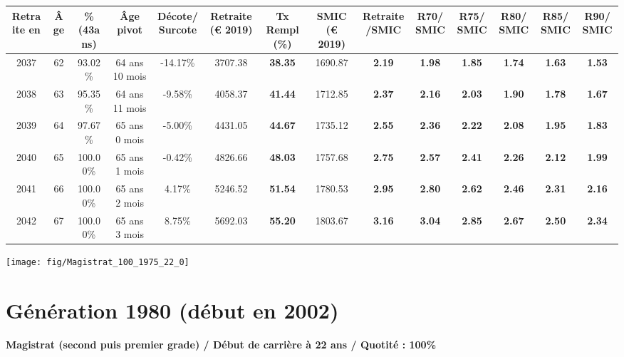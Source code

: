 \begin{adjustbox}{max width=\textwidth} 
\begin{tabular}[htb]{|c|c||c|c|c||c|c||c|c||c|c|c|c|c|} 
\hline 
 Retraite en &  Âge &  \%(43ans) &  Âge pivot &  Décote/Surcote &  Retraite (\euro{} 2019) &  Tx Rempl(\%) &  SMIC (\euro{} 2019) &  Retraite/SMIC &  R70/SMIC &  R75/SMIC &  R80/SMIC &  R85/SMIC &  R90/SMIC \\ 
\hline \hline 
 2037 &  62 &  93.02\% &  64 ans 10 mois &  -14.17\% &  3707.38 &  {\bf 38.35} &  1690.87 &  {\bf 2.19} &  {\bf 1.98} &  {\bf 1.85} &  {\bf 1.74} &  {\bf 1.63} &  {\bf 1.53} \\ 
\hline 
 2038 &  63 &  95.35\% &  64 ans 11 mois &  -9.58\% &  4058.37 &  {\bf 41.44} &  1712.85 &  {\bf 2.37} &  {\bf 2.16} &  {\bf 2.03} &  {\bf 1.90} &  {\bf 1.78} &  {\bf 1.67} \\ 
\hline 
 2039 &  64 &  97.67\% &  65 ans 0 mois &  -5.00\% &  4431.05 &  {\bf 44.67} &  1735.12 &  {\bf 2.55} &  {\bf 2.36} &  {\bf 2.22} &  {\bf 2.08} &  {\bf 1.95} &  {\bf 1.83} \\ 
\hline 
 2040 &  65 &  100.00\% &  65 ans 1 mois &  -0.42\% &  4826.66 &  {\bf 48.03} &  1757.68 &  {\bf 2.75} &  {\bf 2.57} &  {\bf 2.41} &  {\bf 2.26} &  {\bf 2.12} &  {\bf 1.99} \\ 
\hline 
 2041 &  66 &  100.00\% &  65 ans 2 mois &  4.17\% &  5246.52 &  {\bf 51.54} &  1780.53 &  {\bf 2.95} &  {\bf 2.80} &  {\bf 2.62} &  {\bf 2.46} &  {\bf 2.31} &  {\bf 2.16} \\ 
\hline 
 2042 &  67 &  100.00\% &  65 ans 3 mois &  8.75\% &  5692.03 &  {\bf 55.20} &  1803.67 &  {\bf 3.16} &  {\bf 3.04} &  {\bf 2.85} &  {\bf 2.67} &  {\bf 2.50} &  {\bf 2.34} \\ 
\hline 
\hline 
\end{tabular} 
\end{adjustbox} 
 
 \vspace{0.1cm} 

 {\hspace{-2.2cm}\texttt{[image: fig/Magistrat\_100\_1975\_22\_0]}} 

\newpage 
 
\section{Génération 1980 (début en 2002)\label{Magistrat_100_1980_22_0}} 
 
{\bf \noindent Magistrat (second puis premier grade) / Début de carrière à 22 ans / Quotité : 100\%}  ~ 

